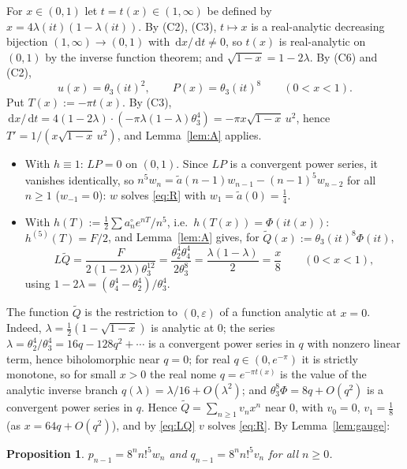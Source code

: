 \documentclass[11pt]{amsart}
\newtheorem{proposition}[theorem]{Proposition}
\theoremstyle{definition}
\theoremstyle{remark}
\numberwithin{equation}{section}
\newcommand{\dd}{\,\mathrm{d}}
\newcommand{\at}{\tilde a}
\begin{document}
For $x\in(0,1)$ let $t=t(x)\in(1,\infty)$ be defined by $x=4\lambda(it)(1-\lambda(it))$. By (C2), (C3), $t\mapsto x$ is a real-analytic decreasing bijection $(1,\infty)\to(0,1)$ with $\dd x/\dd t\ne0$, so $t(x)$ is real-analytic on $(0,1)$ by the inverse function theorem; and $\sqrt{1-x}=1-2\lambda$. By (C6) and (C2),
\begin{equation}\label{eq:Ptheta}
u(x)=\theta_3(it)^2,\qquad P(x)=\theta_3(it)^8\qquad(0<x<1).
\end{equation}
Put $T(x):=-\pi t(x)$. By (C3), $\dd x/\dd t=4(1-2\lambda)\cdot(-\pi\lambda(1-\lambda)\theta_3^4)=-\pi x\sqrt{1-x}\,u^2$, hence $T'=1/(x\sqrt{1-x}\,u^2)$, and Lemma~\ref{lem:A} applies.
\begin{itemize}
\item With $h\equiv1$: $LP=0$ on $(0,1)$. Since $LP$ is a convergent power series, it vanishes identically, so $n^5w_n=\at(n-1)w_{n-1}-(n-1)^5w_{n-2}$ for all $n\ge1$ ($w_{-1}=0$): $w$ solves \eqref{eq:R} with $w_1=\at(0)=\frac14$.
\item With $h(T):=\frac12\sum a^\circ_ne^{nT}/n^5$, i.e.\ $h(T(x))=\Phi(it(x))$: $h^{(5)}(T)=F/2$, and Lemma~\ref{lem:A} gives, for $\tilde Q(x):=\theta_3(it)^8\Phi(it)$,
\begin{equation}\label{eq:LQ}
L\tilde Q=\frac{F}{2(1-2\lambda)\theta_3^{12}}=\frac{\theta_2^4\theta_4^4}{2\theta_3^8}=\frac{\lambda(1-\lambda)}2=\frac x8\qquad(0<x<1),
\end{equation}
using $1-2\lambda=(\theta_4^4-\theta_2^4)/\theta_3^4$.
\end{itemize}
The function $\tilde Q$ is the restriction to $(0,\varepsilon)$ of a function analytic at $x=0$. Indeed, $\lambda=\frac12(1-\sqrt{1-x})$ is analytic at $0$; the series $\lambda=\theta_2^4/\theta_3^4=16q-128q^2+\cdots$ is a convergent power series in $q$ with nonzero linear term, hence biholomorphic near $q=0$; for real $q\in(0,e^{-\pi})$ it is strictly monotone, so for small $x>0$ the real nome $q=e^{-\pi t(x)}$ is the value of the analytic inverse branch $q(\lambda)=\lambda/16+O(\lambda^2)$; and $\theta_3^8\Phi=8q+O(q^2)$ is a convergent power series in $q$. Hence $\tilde Q=\sum_{n\ge1}v_nx^n$ near $0$, with $v_0=0$, $v_1=\frac18$ (as $x=64q+O(q^2)$), and by \eqref{eq:LQ} $v$ solves \eqref{eq:R}. By Lemma~\ref{lem:gauge}:

\begin{proposition}
$p_{n-1}=8^nn!^5w_n$ and $q_{n-1}=8^nn!^5v_n$ for all $n\ge0$.
\end{proposition}
\end{document}
